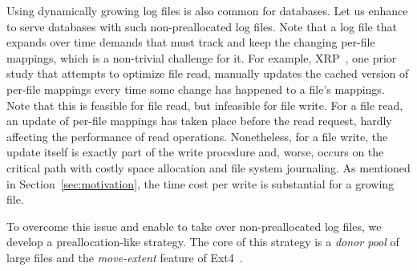 Using dynamically growing log files is also common for databases.
Let us enhance \odes
to serve databases  with such non-preallocated log files.
Note that a log file that expands over time demands that \odes
must track and keep the   changing per-file mappings, which is a non-trivial challenge for it. For example,
XRP~\cite{280870}, one prior study that attempts to optimize file read, manually updates the cached version of per-file mappings 
 every time some change has happened to a file's mappings. Note that
 this is feasible for file read, but infeasible for file write. %
For a file read, an update of per-file mappings %
  has taken place
before the read request, hardly affecting the performance of   read operations.
Nonetheless,
for a file write, the update itself is exactly part of the   write procedure and, worse, %
occurs on the critical path with costly space allocation and file system journaling.
As mentioned in Section~\ref{sec:motivation}, 
the   time  cost  per   write 
is  substantial for a growing file. %
 


To overcome this issue and enable \odes to take over non-preallocated log files,
we develop a preallocation-like strategy.
The core of this strategy is a    {\em donor pool}  of large files and the {\em move-extent} feature of Ext4~\cite{ext4moveextent}.
 
